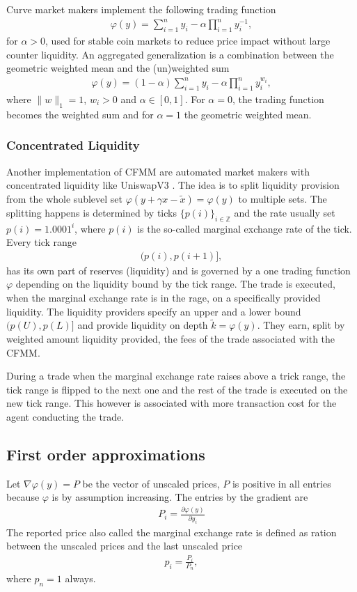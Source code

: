 Curve \cite{stableswap} market makers implement the following trading function
\begin{align}
    \varphi(y) =\sum_{i=1}^{n}y_i  - \alpha \prod_{i=1}^{n} y_i^{-1} ,
\end{align}
for $\alpha > 0$, used for stable coin markets to reduce price impact without
large counter liquidity. An aggregated generalization is a combination between
the geometric weighted mean and the (un)weighted sum
\begin{align}
    \varphi(y) =(1-\alpha)\sum_{i=1}^{n}y_i  - \alpha \prod_{i=1}^{n} y_i^{w_i},
\end{align}
where $\| w\|_1 = 1$, $w_i > 0$ and $\alpha \in [0,1]$. For $\alpha = 0$, the
trading function becomes the weighted sum and for $\alpha = 1$ the geometric
weighted mean.

\subsubsection{Concentrated Liquidity}
Another implementation of CFMM are automated market makers with concentrated
liquidity like UniswapV3 \cite{uniswapv3_paper}. The idea is to split
liquidity provision from the whole sublevel set
$\varphi(y +\gamma x-\tilde{x}) =\varphi(y)$ to multiple sets. The splitting
happens is determined by ticks $\{p(i)\}_{i \in \mathbb{Z} }$ and the rate
usually set $p(i) = 1.0001^{i}$, where $p(i)$ is the so-called marginal
exchange rate of the tick. Every tick range
\begin{align}
    (p(i), p(i+1)],
\end{align}
has its own part of reserves (liquidity) and is governed by a one trading
function $\varphi$ depending on the liquidity bound by the tick range. The
trade is executed, when the marginal exchange rate is in the rage, on a
specifically provided liquidity. The liquidity providers specify an upper and
a lower bound $(p(U), p(L)]$ and provide liquidity on depth $\tilde{k} =
\varphi(y)$. They earn, split by weighted amount liquidity provided, the fees
of the trade associated with the CFMM.

During a trade when the marginal exchange rate raises above a trick range,
the tick range is flipped to the next one and the rest of the trade is
executed on the new tick range. This however is associated with more
transaction cost for the agent conducting the trade.
\subsection{First order approximations\label{sec: first_order_approx}}
Let $\nabla \varphi(y) = P$ be the vector of unscaled prices, $P$ is positive
in all entries because $\varphi$ is by assumption increasing. The entries by
the gradient are
\begin{align}
    P_i = \frac{\partial \varphi(y)}{\partial y_i}
\end{align}
The reported price also called the marginal exchange rate is defined as
ration between the unscaled prices and the last unscaled price
\begin{align}
    p_i = \frac{P_i}{P_n},
\end{align}
where $p_n = 1$ always.

